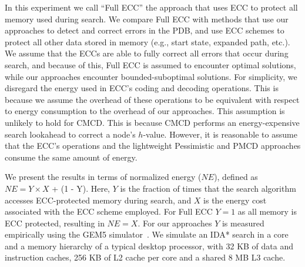 \documentclass[letterpaper]{article}
\begin{document}
In this experiment we call ``Full ECC'' the approach that uses ECC to protect all memory used during search. We compare Full ECC with methods that use our approaches to detect and correct errors in the PDB, and use ECC schemes to protect all other data stored in memory (e.g., start state, expanded path, etc.). We assume that the ECCs are able to fully correct all errors that occur during search, and because of this, Full ECC is assumed to encounter optimal solutions, while our approaches encounter bounded-suboptimal solutions. For simplicity, we disregard the energy used in ECC's coding and decoding operations. This is because we assume the overhead of these operations to be equivalent with respect to energy consumption to the overhead of our approaches. This assumption is unlikely to hold for CMCD. This is because CMCD performs an energy-expensive search lookahead to correct a node's $h$-value. However, it is reasonable to assume that the ECC's operations and the lightweight Pessimistic and PMCD approaches consume the same amount of energy. 



We present the results in terms of normalized energy ($NE$), defined as $NE = Y \times X$ + (1 - Y). Here, $Y$ is the fraction of times that the search algorithm accesses ECC-protected memory during search, and $X$ is the energy cost associated with the ECC scheme employed. For Full ECC $Y = 1$ as all memory is ECC protected, resulting in $NE = X$. For our approaches $Y$ is measured empirically using the GEM5 simulator~\cite{Binkert2011}. We simulate an IDA* search in a core and a memory hierarchy of a typical desktop processor, with 32 KB of data and instruction caches, 256 KB of L2 cache per core and a shared 8 MB L3 cache. 


\end{document}
